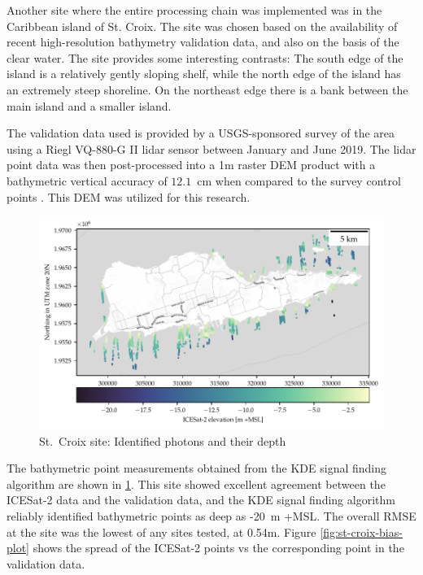 Another site where the entire processing chain was implemented was in the Caribbean island of St. Croix. The site was chosen based on the availability of recent high-resolution bathymetry validation data, and also on the basis of the clear water. The site provides some interesting contrasts: The south edge of the island is a relatively gently sloping shelf, while the north edge of the island has an extremely steep shoreline. On the northeast edge there is a bank between the main island and a smaller island.

The validation data used is provided by a USGS-sponsored survey of the area using a Riegl VQ-880-G II lidar sensor between January and June 2019. The lidar point data was then post-processed into a 1m raster DEM product with a bathymetric vertical accuracy of $12.1$~cm when compared to the survey control points \parencite{USVI-lidar2022}. This DEM was utilized for this research.


\begin{figure}[htbp]
    \centering
    \includegraphics{figures/stcroix_photon_map.pdf}
    \caption{St.~Croix site: Identified photons and their depth}
    \label{fig:st-croix-photons}
\end{figure}

The bathymetric point measurements obtained from the KDE signal finding algorithm are shown in \ref{fig:st-croix-photons}. This site showed excellent agreement between the ICESat-2 data and the validation data, and the KDE signal finding algorithm reliably identified bathymetric points as deep as -20~m +MSL. The overall RMSE at the site was the lowest of any sites tested, at 0.54m. Figure \ref{fig:st-croix-bias-plot} shows the spread of the ICESat-2 points vs the corresponding point in the validation data.

